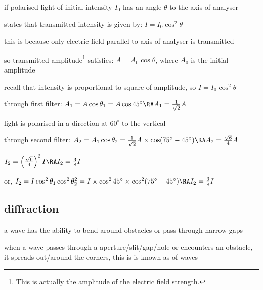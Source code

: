 \cmt if polarised light of initial intensity $I_0$ has an angle $\theta$ to the axis of analyser

 states that transmitted intensity is given by: $\boxed{I = I_0 \cos^2 \theta}$

this is because only electric field parallel to axis of analyser is transmitted

so transmitted amplitude\footnote{This is actually the amplitude of the electric field strength.} satisfies: $A = A_0 \cos\theta$, where $A_0$ is the initial amplitude

recall that intensity is proportional to square of amplitude, so $I = I_0 \cos^2 \theta $


\sol through first filter: $A_1 = A \cos\theta_1 = A \cos 45^\circ \RA A_1 = \frac{1}{\sqrt{2}} A $

\phantom{through filter: } light is polarised in a direction at $60^\circ$ to the vertical

through second filter: $A_2 = A_1 \cos\theta_2 = \frac{1}{\sqrt{2}} A \times \cos (75^\circ - 45^\circ) \RA A_2 = \frac{\sqrt{6}}{4} A $

\phantom{through filter: } $I_2 = \left(\frac{\sqrt{6}}{4} \right)^2 I \RA I_2 = \frac{3}{8} I$

\phantom{through filter: } or, $I_2 = I \cos^2\theta_1 \cos^2 \theta_2^2 = I \times \cos^2 45^\circ \times \cos^2 (75^\circ-45^\circ) \RA I_2 = \frac{3}{8} I$ \eoe







\subsection{diffraction}

a wave has the ability to bend around obstacles or pass through narrow gaps

\begin{ilight}
	when a wave passes through a aperture/slit/gap/hole or encounters an obstacle, it spreads out/around the corners, this is is known as  of waves
\end{ilight}

